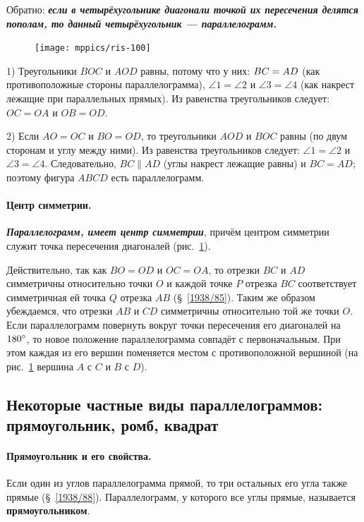 \documentclass[oneside]{book}
\begin{document}
Обратно:
\textbf{\emph{если в четырёхугольнике диагонали точкой их пересечения делятся пополам, то данный четырёхугольник — параллелограмм.}}

{

\begin{figure}
\vskip-4mm
\centering
\texttt{[image: mppics/ris-100]}
\caption{}\label{1938/ris-100}
\end{figure}

1) Треугольники $BOC$ и $AOD$ равны, потому что у них:
$BC\z=AD$ (как противоположные стороны параллелограмма), $\angle 1 = \angle 2$ и $\angle 3 = \angle 4$ (как накрест лежащие при параллельных прямых).
Из равенства треугольников следует:
$OC=OA$ и $OB=OD$.


2) Если $AO=OC$ и $BO=OD$, то треугольники $AOD$ и $BOC$ равны (по двум сторонам и углу между ними).
Из равенства треугольников следует:
$\angle 1 = \angle 2$ и $\angle 3 = \angle 4$.
Следовательно, $BC \parallel AD$ (углы накрест лежащие равны) и $BC=AD$;
поэтому фигура $ABCD$ есть параллелограмм.

}

\paragraph{Центр симметрии.}\label{1938/91}
\textbf{\emph{Па\-ра\-лле\-ло\-грамм, имеет центр симметрии}}, причём центром симметрии служит точка пересечения диагоналей (рис.~\ref{1938/ris-100}).

Действительно, так как $BO=OD$ и $OC=OA$, то отрезки $BC$ и $AD$ симметричны относительно точки $O$ и каждой точке $P$ отрезка $BC$ соответствует симметричная ей точка $Q$ отрезка $AB$ (§~\ref{1938/85}).
Таким же образом убеждаемся, что отрезки $AB$ и $CD$ симметричны относительно той же точки $O$.
Если параллелограмм повернуть вокруг точки пересечения его диагоналей на $180\degree$, то новое положение параллелограмма совпадёт с первоначальным.
При этом каждая из его вершин поменяется местом с противоположной вершиной 
(на рис.~\ref{1938/ris-100} вершина $A$ с $C$ и $B$ с $D$).

\subsection*{Некоторые частные виды параллелограммов:
прямоугольник, ромб, квадрат}

\paragraph{Прямоугольник и его свойства.}\label{1938/92}
Если один из углов параллелограмма прямой, то три остальных его угла также прямые (§~\ref{1938/88}).
Параллелограмм, у которого все углы прямые, называется \textbf{прямоугольником}.
\end{document}
